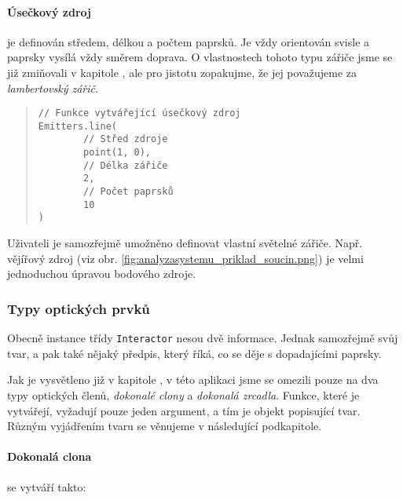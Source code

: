 
\paragraph{Úsečkový zdroj} je definován středem, délkou a počtem paprsků. Je vždy orientován svisle a paprsky vysílá vždy směrem doprava. O vlastnostech tohoto typu zářiče jsme se již zmiňovali v kapitole , ale pro jistotu zopakujme, že jej považujeme za \emph{lambertovský zářič}.\src

\begin{minipage}{\textwidth}\begin{quote}\begin{lstlisting}
// Funkce vytvářející úsečkový zdroj
Emitters.line(
        // Střed zdroje
        point(1, 0),
        // Délka zářiče
        2,
        // Počet paprsků
        10
)
\end{lstlisting}\end{quote}\end{minipage}


Uživateli je samozřejmě umožněno definovat vlastní světelné zářiče. Např. vějířový zdroj (viz obr. \ref{fig:analyzasystemu_priklad_soucin.png}) je velmi jednoduchou úpravou bodového zdroje.


\subsubsection{Typy optických prvků}

Obecně instance třídy \texttt{Interactor} nesou dvě informace. Jednak samozřejmě svůj tvar, a pak také nějaký předpis, který říká, co se děje s dopadajícími paprsky.

Jak je vysvětleno již v kapitole , v této aplikaci jsme se omezili pouze na dva typy optických členů, \emph{dokonalé clony} a \emph{dokonalá zrcadla}. Funkce, které je vytvářejí, vyžadují pouze jeden argument, a tím je objekt popisující tvar. Různým vyjádřením tvaru se věnujeme v následující podkapitole.

\paragraph{Dokonalá clona} se vytváří takto:

